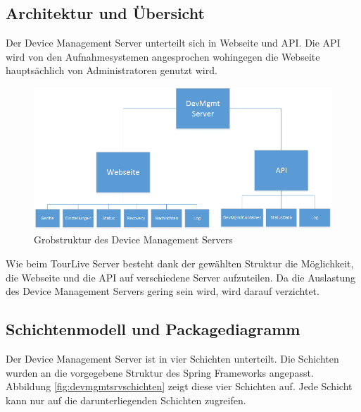 \subsection{Architektur und Übersicht}
Der Device Management Server unterteilt sich in Webseite und API. Die API wird von den Aufnahmesystemen angesprochen wohingegen die Webseite hauptsächlich von Administratoren genutzt wird.

\begin{figure}[H]
	\centering
	\includegraphics[width=130mm]{images/devmgmtsrv/uebersicht.png}
	\caption{Grobstruktur des Device Management Servers}
\end{figure}

Wie beim TourLive Server besteht dank der gewählten Struktur die Möglichkeit, die Webseite und die API auf verschiedene Server aufzuteilen. Da die Auslastung des Device Management Servers gering sein wird, wird darauf verzichtet.

\subsection{Schichtenmodell und Packagediagramm}
Der Device Management Server ist in vier Schichten unterteilt. Die Schichten wurden an die vorgegebene Struktur des Spring Frameworks angepasst. Abbildung \ref{fig:devmgmtsrvschichten} zeigt diese vier Schichten auf. Jede Schicht kann nur auf die darunterliegenden Schichten zugreifen.

